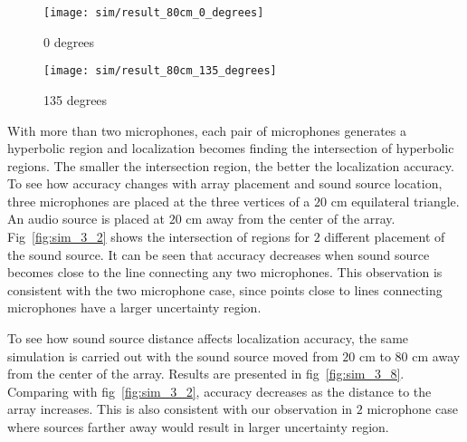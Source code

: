 \begin{figure*}[]
  \centering
  \begin{subfigure}[]{.46\textwidth}
    \texttt{[image: sim/result\_80cm\_0\_degrees]}
    \caption{0 degrees}
  \end{subfigure}
  \begin{subfigure}[]{.46\textwidth}
    \texttt{[image: sim/result\_80cm\_135\_degrees]}
    \caption{135 degrees}
  \end{subfigure}
  \caption{Uncertainty region. Microphones are at the vertices of a $20$cm equilateral triangle. The source is $80$cm away from the array.}
  \label{fig:sim_3_8}
\end{figure*}

With more than two microphones, each pair of microphones generates a hyperbolic region and localization becomes finding the intersection of hyperbolic regions. The smaller the intersection region, the better the localization accuracy. To see how accuracy changes with array placement and sound source location, three microphones are placed at the three vertices of a $20$ cm equilateral triangle. An audio source is placed at $20$ cm away from the center of the array. Fig~\ref{fig:sim_3_2} shows the intersection of regions for $2$ different placement of the sound source. It can be seen that accuracy decreases when sound source becomes close to the line connecting any two microphones. This observation is consistent with the two microphone case, since points close to lines connecting microphones have a larger uncertainty region.

To see how sound source distance affects localization accuracy, the same simulation is carried out with the sound source moved from $20$ cm to $80$ cm away from the center of the array. Results are presented in fig~\ref{fig:sim_3_8}. Comparing with fig~\ref{fig:sim_3_2}, accuracy decreases as the distance to the array increases. This is also consistent with our observation in $2$ microphone case where sources farther away would result in larger uncertainty region.

